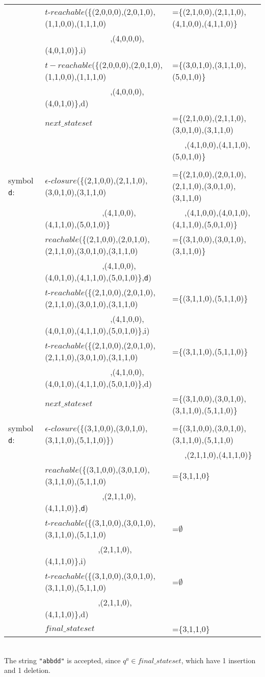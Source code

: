 \begin{myex}
\begin{table}[h!]
\begin{tabular}{l l l}
&$t$-$reachable$(\{(2,0,0,0),(2,0,1,0),(1,1,0,0),(1,1,1,0)&=\{(2,1,0,0),(2,1,1,0),(4,1,0,0),(4,1,1,0)\}\\
&~~~~~~~~~~~~~~~~,(4,0,0,0),(4,0,1,0)\},i)\\

&$t-reachable$(\{(2,0,0,0),(2,0,1,0),(1,1,0,0),(1,1,1,0)&=\{(3,0,1,0),(3,1,1,0),(5,0,1,0)\}\\
&~~~~~~~~~~~~~~~~,(4,0,0,0),(4,0,1,0)\},d)\\

&$next\_stateset$&=\{(2,1,0,0),(2,1,1,0),(3,0,1,0),(3,1,1,0)\\
&&~~~,(4,1,0,0),(4,1,1,0),(5,0,1,0)\}\\
\\
symbol {\tt d}:&$\epsilon$-$closure$(\{(2,1,0,0),(2,1,1,0),(3,0,1,0),(3,1,1,0)&=\{(2,1,0,0),(2,0,1,0),(2,1,1,0),(3,0,1,0),(3,1,1,0)\\
&~~~~~~~~~~~~~~,(4,1,0,0),(4,1,1,0),(5,0,1,0)\}&~~~,(4,1,0,0),(4,0,1,0),(4,1,1,0),(5,0,1,0)\}\\
&$reachable$(\{(2,1,0,0),(2,0,1,0),(2,1,1,0),(3,0,1,0),(3,1,1,0)&=\{(3,1,0,0),(3,0,1,0),(3,1,1,0)\}\\
&~~~~~~~~~~~~~~,(4,1,0,0),(4,0,1,0),(4,1,1,0),(5,0,1,0)\},{\tt d})\\

&$t$-$reachable$(\{(2,1,0,0),(2,0,1,0),(2,1,1,0),(3,0,1,0),(3,1,1,0)&=\{(3,1,1,0),(5,1,1,0)\}\\
&~~~~~~~~~~~~~~~~,(4,1,0,0),(4,0,1,0),(4,1,1,0),(5,0,1,0)\},i)\\

&$t$-$reachable$(\{(2,1,0,0),(2,0,1,0),(2,1,1,0),(3,0,1,0),(3,1,1,0)&=\{(3,1,1,0),(5,1,1,0)\}\\
&~~~~~~~~~~~~~~~~,(4,1,0,0),(4,0,1,0),(4,1,1,0),(5,0,1,0)\},d)\\
&$next\_stateset$&=\{(3,1,0,0),(3,0,1,0),(3,1,1,0),(5,1,1,0)\}\\
\\
symbol {\tt d}:&$\epsilon$-$closure$(\{(3,1,0,0),(3,0,1,0),(3,1,1,0),(5,1,1,0)\})&=\{(3,1,0,0),(3,0,1,0),(3,1,1,0),(5,1,1,0)\\
&&~~~,(2,1,1,0),(4,1,1,0)\}\\
&$reachable$(\{(3,1,0,0),(3,0,1,0),(3,1,1,0),(5,1,1,0)&=\{3,1,1,0\}\\
&~~~~~~~~~~~~~~,(2,1,1,0),(4,1,1,0)\},{\tt d})\\
&$t$-$reachable$(\{(3,1,0,0),(3,0,1,0),(3,1,1,0),(5,1,1,0)&=$\emptyset$\\
&~~~~~~~~~~~~~,(2,1,1,0),(4,1,1,0)\},i)\\
&$t$-$reachable$(\{(3,1,0,0),(3,0,1,0),(3,1,1,0),(5,1,1,0)&=$\emptyset$\\
&~~~~~~~~~~~~~,(2,1,1,0),(4,1,1,0)\},d)\\
&$final\_stateset$&=\{3,1,1,0\}
\end{tabular}
\end{table}\\
The string {\tt "abbdd"} is accepted, since $q^a\in final\_stateset$, which have 1 insertion and 1 deletion.
\end{myex}